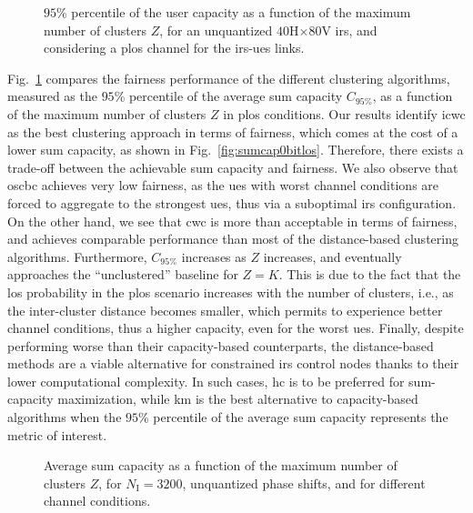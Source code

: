 \begin{figure}[t]
    \centering
    \setlength{}
    \setlength{}
    
    \caption{$95$\% percentile of the user capacity as a function of the maximum number of clusters   $Z$, for an unquantized $40$H$\times80$V \gls{irs}, and considering a \gls{plos} channel for the \gls{irs}-\glspl{ue} links.}
    \label{fig:quantile0bitsplos}
\end{figure}


Fig.~\ref{fig:quantile0bitsplos} compares the fairness performance of the different clustering algorithms, measured as the $95$\% percentile of the average sum capacity $C_{95\%}$, as a function of the maximum number of clusters $Z$ in \gls{plos} conditions. 
Our results identify \gls{icwc} as the best clustering approach in terms of fairness, which comes at the cost of a lower sum capacity,  as shown in Fig.~\ref{fig:sumcap0bitlos}. 
Therefore, there exists a trade-off between the achievable sum capacity and fairness. 
We also observe that \gls{oscbc} achieves very low fairness, as the \glspl{ue} with worst channel conditions are forced to aggregate to the strongest \glspl{ue}, thus via a suboptimal \gls{irs} configuration. On the other hand, we see that \gls{cwc} is more than acceptable in terms of fairness, and achieves comparable performance than most of the distance-based clustering algorithms.
Furthermore, $C_{95\%}$ increases as $Z$ increases, and eventually approaches the ``unclustered'' baseline for $Z=K$. This is due to the fact that the \gls{los} probability in the \gls{plos} scenario increases with the number of clusters, i.e., as the inter-cluster distance becomes smaller, which permits to experience better channel conditions, thus a higher capacity, even for the worst \glspl{ue}.
Finally, despite performing worse than their capacity-based counterparts, the distance-based methods are a viable alternative for constrained \gls{irs} control nodes thanks to their lower computational complexity. In such cases, \gls{hc} is to be preferred for sum-capacity maximization, while \gls{km} is the best alternative to capacity-based algorithms when the $95$\% percentile of the average sum capacity represents the metric of interest.

\begin{figure}[t]
    \centering
    \setlength{}
    \setlength{}
    
    \caption{Average sum capacity as a function of the maximum number of clusters $Z$, for $N_{\mathrm I}=3200$, unquantized phase shifts, and for different channel conditions.}
    \label{fig:sumcaplos}
\end{figure}

